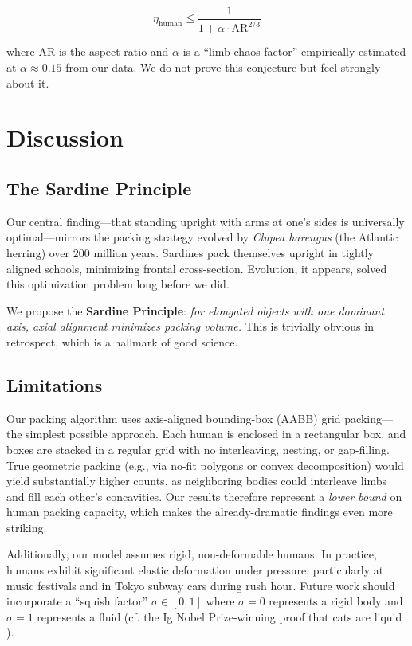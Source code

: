 \documentclass[11pt,letterpaper]{article}
\begin{document}
\begin{equation}
    \eta_{\text{human}} \leq \frac{1}{1 + \alpha \cdot \text{AR}^{2/3}}
\end{equation}

where AR is the aspect ratio and $\alpha$ is a ``limb chaos factor'' empirically estimated at $\alpha \approx 0.15$ from our data. We do not prove this conjecture but feel strongly about it.

\section{Discussion}

\subsection{The Sardine Principle}

Our central finding---that standing upright with arms at one's sides is universally optimal---mirrors the packing strategy evolved by \emph{Clupea harengus} (the Atlantic herring) over 200 million years. Sardines pack themselves upright in tightly aligned schools, minimizing frontal cross-section. Evolution, it appears, solved this optimization problem long before we did.

We propose the \textbf{Sardine Principle}: \emph{for elongated objects with one dominant axis, axial alignment minimizes packing volume.} This is trivially obvious in retrospect, which is a hallmark of good science.

\subsection{Limitations}

Our packing algorithm uses axis-aligned bounding-box (AABB) grid packing---the simplest possible approach. Each human is enclosed in a rectangular box, and boxes are stacked in a regular grid with no interleaving, nesting, or gap-filling. True geometric packing (e.g., via no-fit polygons or convex decomposition) would yield substantially higher counts, as neighboring bodies could interleave limbs and fill each other's concavities. Our results therefore represent a \emph{lower bound} on human packing capacity, which makes the already-dramatic findings even more striking.

Additionally, our model assumes rigid, non-deformable humans. In practice, humans exhibit significant elastic deformation under pressure, particularly at music festivals and in Tokyo subway cars during rush hour. Future work should incorporate a ``squish factor'' $\sigma \in [0, 1]$ where $\sigma = 0$ represents a rigid body and $\sigma = 1$ represents a fluid (cf. the Ig Nobel Prize-winning proof that cats are liquid \cite{fardin2014}).
\end{document}
